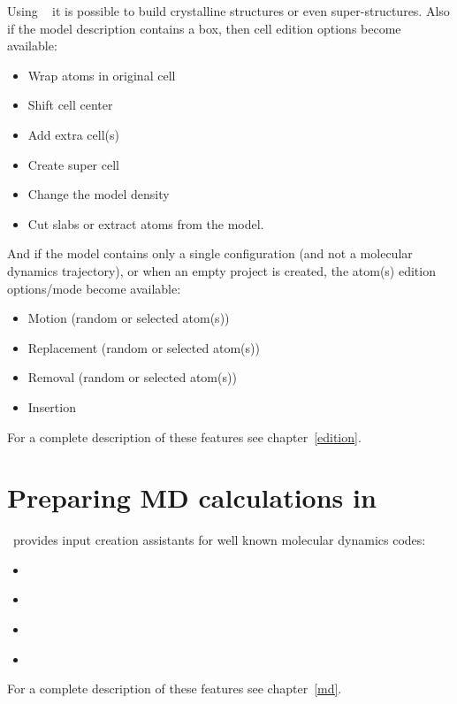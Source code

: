 Using \atomes\  it is possible to build crystalline structures or even super-structures.  
Also if the model description contains a box, then cell edition options become available:
\begin{itemize}
\item Wrap atoms in original cell
\item Shift cell center
\item Add extra cell(s)
\item Create super cell
\item Change the model density
\item Cut slabs or extract atoms from the model.
\end{itemize}
And if the model contains only a single configuration (and not a molecular dynamics trajectory), or when an empty project is created, the atom(s) edition options/mode become available:
\begin{itemize}
\item Motion (random or selected atom(s))
\item Replacement (random or selected atom(s))
\item Removal (random or selected atom(s))
\item Insertion
\end{itemize}
For a complete description of these features see chapter~\ref{edition}.

\section{Preparing MD calculations in \atomes}

\atomes\ provides input creation assistants for well known molecular dynamics codes:
\begin{itemize}
\item \cpmd\ \cite{CPMD}
\item \cptk\ \cite{CP2K}
\item \dlpoly\ \cite{DLPOLY}
\item \lammps\ \cite{LAMMPS}
\end{itemize}
For a complete description of these features see chapter~\ref{md}.

